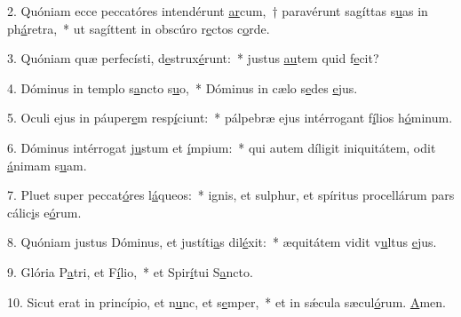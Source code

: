 2. Quóniam ecce peccatóres intendérunt \uline{ar}cum,~† paravérunt sagíttas s\uline{u}as in ph\uline{á}retra,~* ut sagíttent in obscúro r\uline{e}ctos c\uline{o}rde.\par 
3. Quóniam quæ perfecísti, d\uline{e}strux\uline{é}runt:~* justus \uline{au}tem quid f\uline{e}cit?\par 
4. Dóminus in templo s\uline{a}ncto s\uline{u}o,~* Dóminus in cælo s\uline{e}des \uline{e}jus.\par 
5. Oculi ejus in páuper\uline{e}m resp\uline{í}ciunt:~* pálpebræ ejus intérrogant f\uline{í}lios h\uline{ó}minum.\par 
6. Dóminus intérrogat j\uline{u}stum et \uline{í}mpium:~* qui autem díligit iniquitátem, odit \uline{á}nimam s\uline{u}am.\par 
7. Pluet super peccat\uline{ó}res l\uline{á}queos:~* ignis, et sulphur, et spíritus procellárum pars cálic\uline{i}s e\uline{ó}rum.\par 
8. Quóniam justus Dóminus, et justíti\uline{a}s dil\uline{é}xit:~* æquitátem vidit v\uline{u}ltus \uline{e}jus.\par 
9. Glória P\uline{a}tri, et F\uline{í}lio,~* et Spir\uline{í}tui S\uline{a}ncto.\par 
10. Sicut erat in princípio, et n\uline{u}nc, et s\uline{e}mper,~* et in sǽcula sæcul\uline{ó}rum. \uline{A}men.\par 
